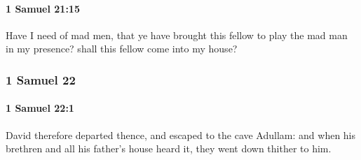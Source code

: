 		\paragraph{1 Samuel 21:15} %
			\label{1SAMUEL-21-15}

			Have I need of mad men, that ye have brought this fellow to play the mad man in my presence? shall this fellow come into my house?

	\subsubsection{1 Samuel 22} %
		\label{1SAMUEL-22}

		\paragraph{1 Samuel 22:1} %
			\label{1SAMUEL-22-1}

			David therefore departed thence, and escaped to the cave Adullam: and when his brethren and all his father’s house heard it, they went down thither to him.

